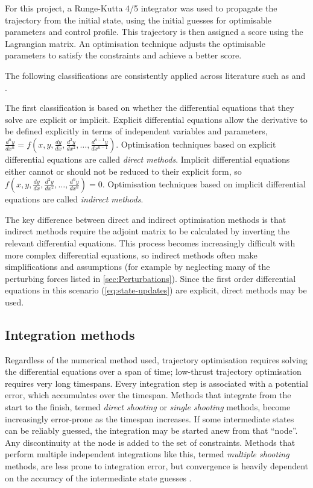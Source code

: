 For this project, a Runge-Kutta 4/5 integrator was used to propagate the trajectory from the initial state, using the initial guesses for optimisable parameters and control profile. This trajectory is then assigned a score using the Lagrangian matrix. An optimisation technique adjusts the optimisable parameters to satisfy the constraints and achieve a better score. %



 The following classifications are consistently applied across literature such as \textcite{Betts1998} and \textcite{ASTOS_guide}.

The first classification is based on whether the differential equations that they solve are explicit or implicit.
Explicit differential equations allow the derivative to be defined explicitly in terms of independent variables and parameters, $\frac{d^ny}{dx^n}=f(x,y,\frac{dy}{dx},\frac{d^2y}{dx^2},\dots,\frac{d^{n-1}y}{dx^{n-1}})$. Optimisation techniques based on explicit differential equations are called \emph{direct methods}. Implicit differential equations either cannot or should not be reduced to their explicit form, so $f(x,y,\frac{dy}{dx},\frac{d^2y}{dx^2},\dots,\frac{d^{n}y}{dx^{n}})=0$. Optimisation techniques based on implicit differential equations are called \emph{indirect methods}.

The key difference between direct and indirect optimisation methods is that indirect methods require the adjoint matrix to be calculated by inverting the relevant differential equations. This process becomes increasingly difficult with more complex differential equations, so indirect methods often make simplifications and assumptions (for example by neglecting many of the perturbing forces listed in \autoref{sec:Perturbations}). Since the first order differential equations in this scenario (\autoref{eq:state-updates}) are explicit, direct methods may be used.

\subsection{Integration methods}

Regardless of the numerical method used, trajectory optimisation requires solving the differential equations over a span of time; low-thrust trajectory optimisation requires very long timespans. Every integration step is associated with a potential error, which accumulates over the timespan. Methods that integrate from the start to the finish, termed \emph{direct shooting} or \emph{single shooting} methods, become increasingly error-prone as the timespan increases. If some intermediate states can be reliably guessed, the integration may be started anew from that \enquote{node}. Any discontinuity at the node is added to the set of constraints. Methods that perform multiple independent integrations like this, termed \emph{multiple shooting} methods, are less prone to integration error, but convergence is heavily dependent on the accuracy of the intermediate state guesses \parencite{Betts, ASTOS_guide}.

